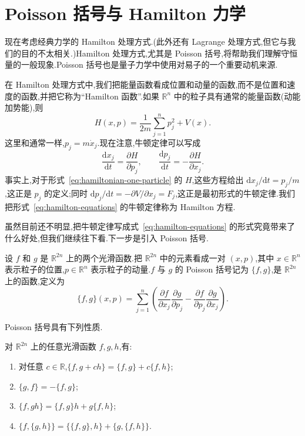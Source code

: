 \section{Poisson 括号与 Hamilton 力学}

现在考虑经典力学的 Hamilton 处理方式.(此外还有 Lagrange 处理方式,但它与我们的目的不太相关.)Hamilton 处理方式,尤其是 Poisson 括号,将帮助我们理解守恒量的一般现象.Poisson 括号也是量子力学中使用对易子的一个重要动机来源.

在 Hamilton 处理方式中,我们把能量函数看成位置和动量的函数,而不是位置和速度的函数,并把它称为“Hamilton 函数”.如果 $\mathbb{R}^{n}$ 中的粒子具有通常的能量函数(动能加势能),则
\begin{equation}
  H(x,p)=\frac{1}{2m}\sum_{j=1}^{n}p_{j}^{2}+V(x).
  \label{eq:hamiltonian-one-particle}
\end{equation}
这里和通常一样,$p_{j}=m\dot{x}_{j}$.现在注意,牛顿定律可以写成
\begin{equation}
  \frac{\mathrm{d}x_{j}}{\mathrm{d}t}=\frac{\partial H}{\partial p_{j}},
  \qquad
  \frac{\mathrm{d}p_{j}}{\mathrm{d}t}=-\frac{\partial H}{\partial x_{j}}.
  \label{eq:hamilton-equations}
\end{equation}
事实上,对于形式~\eqref{eq:hamiltonian-one-particle} 的 $H$,这些方程给出 $\mathrm{d}x_{j}/\mathrm{d}t=p_{j}/m$,这正是 $p_{j}$ 的定义;同时 $\mathrm{d}p_{j}/\mathrm{d}t=-\partial V/\partial x_{j}=F_{j}$,这正是最初形式的牛顿定律.我们把形式~\eqref{eq:hamilton-equations} 的牛顿定律称为 Hamilton 方程.

虽然目前还不明显,把牛顿定律写成式~\eqref{eq:hamilton-equations} 的形式究竟带来了什么好处,但我们继续往下看.下一步是引入 Poisson 括号.

\begin{definition}[Poisson 括号]\label{def:poisson-bracket}
设 $f$ 和 $g$ 是 $\mathbb{R}^{2n}$ 上的两个光滑函数.把 $\mathbb{R}^{2n}$ 中的元素看成一对 $(x,p)$,其中 $x\in\mathbb{R}^{n}$ 表示粒子的位置,$p\in\mathbb{R}^{n}$ 表示粒子的动量.$f$ 与 $g$ 的 Poisson 括号记为 $\{f,g\}$,是 $\mathbb{R}^{2n}$ 上的函数,定义为
\begin{equation}
  \{f,g\}(x,p)=\sum_{j=1}^{n}\left(\frac{\partial f}{\partial x_{j}}\frac{\partial g}{\partial p_{j}}-\frac{\partial f}{\partial p_{j}}\frac{\partial g}{\partial x_{j}}\right).
  \label{eq:poisson-bracket}
\end{equation}
\end{definition}

Poisson 括号具有下列性质.

\begin{proposition}\label{pro:poisson-properties}
对 $\mathbb{R}^{2n}$ 上的任意光滑函数 $f,g,h$,有:
\begin{enumerate}
  \item 对任意 $c\in\mathbb{R}$,$\{f,g+ch\}=\{f,g\}+c\{f,h\}$;
  \item $\{g,f\}=-\{f,g\}$;
  \item $\{f,gh\}=\{f,g\}h+g\{f,h\}$;
  \item $\{f,\{g,h\}\}=\{\{f,g\},h\}+\{g,\{f,h\}\}$.
\end{enumerate}
\end{proposition}

